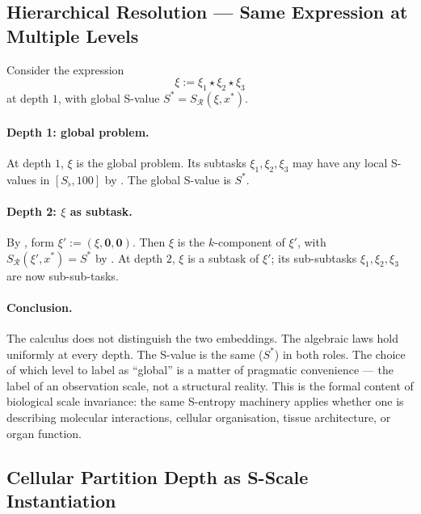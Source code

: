 \subsection{Hierarchical Resolution — Same Expression at Multiple Levels}
\label{subsec:hierarchical-example}

\begin{example}
\label{ex:hierarchical}
Consider the expression
\[
  \xi := \xi_1 \star \xi_2 \star \xi_3
\]
at depth $1$, with global S-value $S^* = S_{\mathcal{R}}(\xi, x^*)$.

\paragraph{Depth 1: global problem.}
At depth $1$, $\xi$ is the global problem.  Its subtasks $\xi_1, \xi_2,
\xi_3$ may have any local S-values in $[S_\flat, 100]$ by
.  The global S-value is $S^*$.

\paragraph{Depth 2: $\xi$ as subtask.}
By , form $\xi' := (\xi, \mathbf{0}, \mathbf{0})$.
Then $\xi$ is the $k$-component of $\xi'$, with
$S_{\mathcal{R}}(\xi', x^*) = S^*$ by .  At depth $2$,
$\xi$ is a subtask of $\xi'$; its sub-subtasks $\xi_1, \xi_2, \xi_3$ are
now sub-sub-tasks.

\paragraph{Conclusion.}
The calculus does not distinguish the two embeddings.  The algebraic laws
hold uniformly at every depth.  The S-value is the same ($S^*$) in both
roles.  The choice of which level to label as ``global'' is a matter of
pragmatic convenience — the label of an observation scale, not a structural
reality.  This is the formal content of biological scale invariance: the
same S-entropy machinery applies whether one is describing molecular
interactions, cellular organisation, tissue architecture, or organ function.
\end{example}

\subsection{Cellular Partition Depth as S-Scale Instantiation}
\label{subsec:cellular-example}

